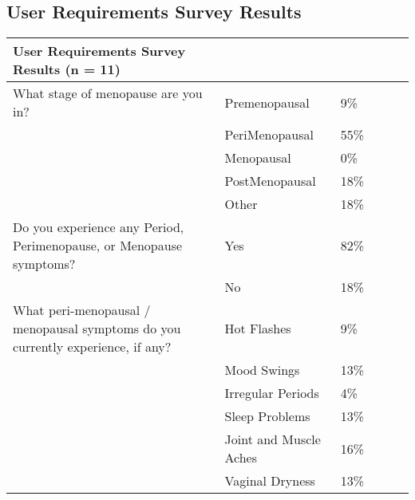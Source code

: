 \subsection{User Requirements Survey Results}
\begin{table}[]
    \begin{tabular}{llllll}
    \hline
    User Requirements Survey Results (n = 11)                                       &                        &      &  &  &  \\ \hline
    What stage of menopause are you in?                                             & Premenopausal          & 9\%  &  &  &  \\
                                                                                    & PeriMenopausal         & 55\% &  &  &  \\
                                                                                    & Menopausal             & 0\%  &  &  &  \\
                                                                                    & PostMenopausal         & 18\% &  &  &  \\
                                                                                    & Other                  & 18\% &  &  &  \\
    Do you experience any Period, Perimenopause, or Menopause symptoms?             & Yes                    & 82\% &  &  &  \\
                                                                                    & No                     & 18\% &  &  &  \\
    What peri-menopausal / menopausal symptoms do you currently experience, if any? & Hot Flashes            & 9\%  &  &  &  \\
                                                                                    & Mood Swings            & 13\% &  &  &  \\
                                                                                    & Irregular Periods      & 4\%  &  &  &  \\
                                                                                    & Sleep Problems         & 13\% &  &  &  \\
                                                                                    & Joint and Muscle Aches & 16\% &  &  &  \\
                                                                                    & Vaginal Dryness        & 13\% &  &  &  \\

\end{tabular}
\end{table}
